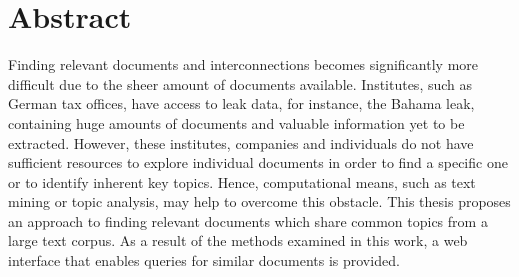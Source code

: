 \chapter*{Abstract}


Finding relevant documents and interconnections becomes significantly more difficult due to the sheer amount of documents available.
Institutes, such as German tax offices, have access to leak data, for instance, the Bahama leak, 
containing huge amounts of documents and valuable information yet to be extracted.
However, these institutes, companies and individuals do not have sufficient resources to explore individual documents 
in order to find a specific one or to identify inherent key topics.
Hence, computational means, such as text mining or topic analysis, may help to overcome this obstacle.
This thesis proposes an approach to finding relevant documents which share common topics from a large text corpus.
As a result of the methods examined in this work, a web interface that enables queries for similar documents is provided. 